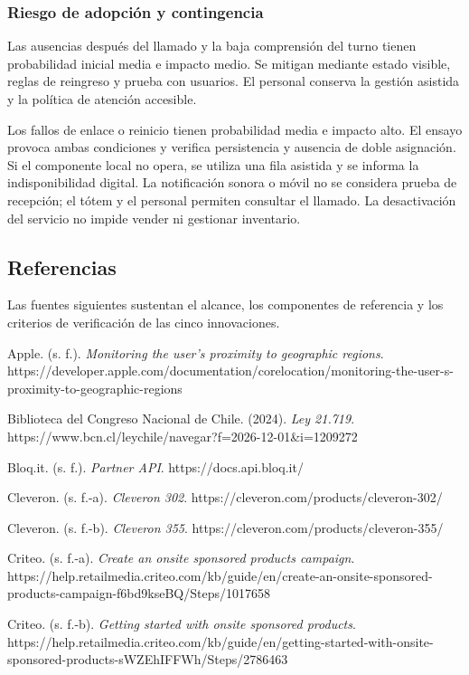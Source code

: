 \documentclass[11pt]{article}
\begin{document}
\subsubsection{Riesgo de adopción y contingencia}\label{riesgo-de-adopciuxf3n-y-contingencia-4}

Las ausencias después del llamado y la baja comprensión del turno tienen probabilidad inicial media e impacto medio. Se mitigan mediante estado visible, reglas de reingreso y prueba con usuarios. El personal conserva la gestión asistida y la política de atención accesible.

Los fallos de enlace o reinicio tienen probabilidad media e impacto alto. El ensayo provoca ambas condiciones y verifica persistencia y ausencia de doble asignación. Si el componente local no opera, se utiliza una fila asistida y se informa la indisponibilidad digital. La notificación sonora o móvil no se considera prueba de recepción; el tótem y el personal permiten consultar el llamado. La desactivación del servicio no impide vender ni gestionar inventario.

\subsection*{Referencias}\label{referencias}

Las fuentes siguientes sustentan el alcance, los componentes de referencia y los criterios de verificación de las cinco innovaciones.

Apple. (s. f.). \emph{Monitoring the user's proximity to geographic regions}. https://developer.apple.com/documentation/corelocation/monitoring-the-user-s-proximity-to-geographic-regions

Biblioteca del Congreso Nacional de Chile. (2024). \emph{Ley 21.719}. https://www.bcn.cl/leychile/navegar?f=2026-12-01\&i=1209272

Bloq.it. (s. f.). \emph{Partner API}. https://docs.api.bloq.it/

Cleveron. (s. f.-a). \emph{Cleveron 302}. https://cleveron.com/products/cleveron-302/

Cleveron. (s. f.-b). \emph{Cleveron 355}. https://cleveron.com/products/cleveron-355/

Criteo. (s. f.-a). \emph{Create an onsite sponsored products campaign}. https://help.retailmedia.criteo.com/kb/guide/en/create-an-onsite-sponsored-products-campaign-f6bd9kseBQ/Steps/1017658

Criteo. (s. f.-b). \emph{Getting started with onsite sponsored products}. https://help.retailmedia.criteo.com/kb/guide/en/getting-started-with-onsite-sponsored-products-sWZEhIFFWh/Steps/2786463
\end{document}
